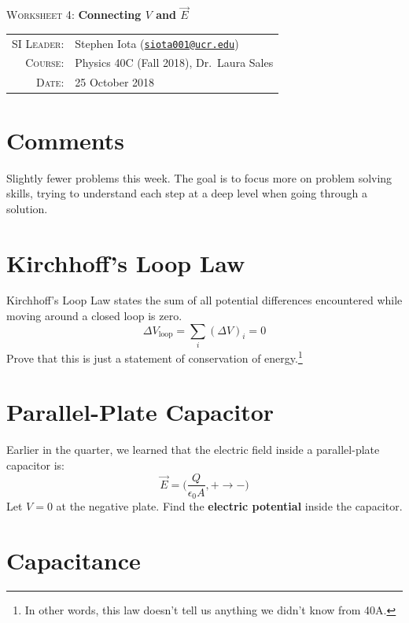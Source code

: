 \documentclass[12pt]{article}
\newcommand{\email}[1]{\texttt{\href{mailto:#1}{#1}}}
\begin{document}
\begin{center}

\Large{\textsc{Worksheet 4}: \textbf{Connecting $V$ and $\vec{E}$}}

\end{center}

\vspace{.5mm}


\begin{tabular}{rl}
\textsc{SI Leader}:
&
Stephen Iota (\email{siota001@ucr.edu})
\\
\textsc{Course}:
&
Physics 40C (Fall 2018), Dr.~Laura Sales
\\
\textsc{Date}:
&
25 October 2018
\end{tabular}


\section{Comments}
Slightly fewer problems this week.
The goal is to focus more on problem solving skills, trying to understand each step at a deep level when going through a solution.

\section{Kirchhoff's Loop Law}
Kirchhoff's Loop Law states the sum of all potential differences encountered while moving around a closed loop is zero.
$$ \Delta V_\mathrm{loop} = \sum_i (\Delta V)_i = 0 $$
Prove that this is just a statement of conservation of energy.\footnote{In other words, this law doesn't tell us anything we didn't know from 40A.}

\vspace{32mm}
\section{Parallel-Plate Capacitor}
Earlier in the quarter, we learned that the electric field inside a parallel-plate capacitor is:
$$ \vec{E} = \Bigg(\frac{Q}{\epsilon_0 A},+\rightarrow-\Bigg) $$
Let $ V = 0 $ at the negative plate.
Find the \textbf{electric potential} inside the capacitor. 


\newpage

\section{Capacitance}
\end{document}
